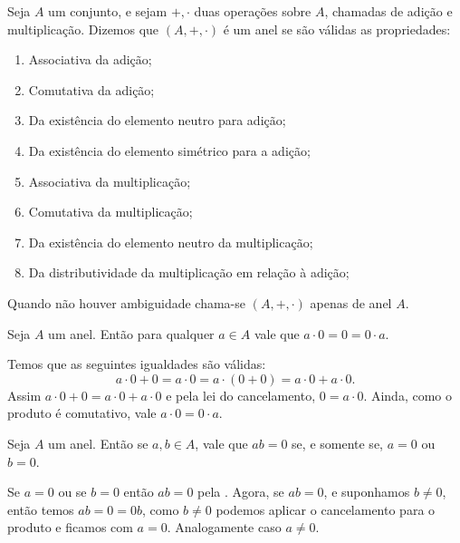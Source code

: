 \documentclass[../main.tex]{subfiles}
\begin{document}



\begin{defi}\label{agb-def-anel}
    Seja $A$ um conjunto, e sejam $+, \cdot$ duas operações sobre $A$, chamadas de adição e multiplicação. Dizemos que $(A, +, \cdot)$ é um anel se são válidas as propriedades:
    \begin{enumerate}[label=(\roman*)]
        \item Associativa da adição;
        \item Comutativa da adição;
        \item Da existência do elemento neutro para adição;
        \item Da existência do elemento simétrico para a adição;
        \item Associativa da multiplicação;
        \item Comutativa da multiplicação;
        \item Da existência do elemento neutro da multiplicação;
        \item Da distributividade da multiplicação em relação à adição;
    \end{enumerate}
    Quando não houver ambiguidade chama-se $(A,+,\cdot)$ apenas de anel $A$.
\end{defi}



\begin{teo}\label{agb-teo-anulamentoProduto1}
    Seja $A$ um anel. Então para qualquer $a \in A$ vale que $a \cdot 0 = 0 = 0 \cdot a$.
\end{teo}
\begin{dem}
 Temos que as seguintes igualdades são válidas: 
    \[a \cdot 0+0 = a \cdot 0 = a \cdot (0+0) = a \cdot 0+a \cdot 0.\] 
    Assim $a \cdot 0+0 = a \cdot 0+a \cdot 0$ e pela lei do cancelamento, $0=a \cdot 0$. Ainda, como o produto é comutativo, vale $a \cdot 0=0 \cdot a$.
\end{dem}

\begin{teo}\label{agr-teo-anulamentoProduto2}
    Seja $A$ um anel. Então se $a,b \in A$, vale que $ab = 0$ se, e somente se, $a = 0$ ou $b = 0$.
\end{teo}
\begin{dem}
    Se $a = 0$ ou se $b=0$ então $ab = 0$ pela .
    Agora, se $ab=0$, e suponhamos $b \neq 0$, então temos $ab = 0 = 0b$, como $b \neq 0$ podemos aplicar o cancelamento para o produto e ficamos com $a=0$. Analogamente caso $a \neq 0$.
\end{dem}
\end{document}
